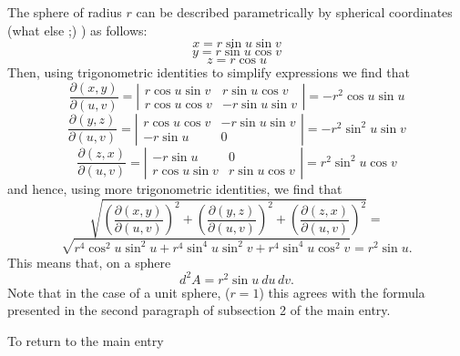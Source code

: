 \documentclass[12pt]{article}
\begin{document}
The sphere of radius $r$ can be described parametrically by spherical coordinates (what else ;) ) as follows:
 $$ x = r \sin u \sin v $$
 $$ y = r \sin u \cos v $$
 $$ z = r \cos u $$
Then, using trigonometric identities to simplify expressions we find that
 $$\frac{\partial (x, y)}{\partial (u,v)} =
\left| \begin{matrix}
r \cos u \sin v & r \sin u \cos v \\
r \cos u \cos v & -r \sin u \sin v
\end{matrix} \right| =
- r^2 \cos u \sin u$$
$$\frac{\partial (y, z)}{\partial (u,v)} =
\left| \begin{matrix}
r \cos u \cos v & -r \sin u \sin v \\
- r \sin u & 0
\end{matrix} \right| =
- r^2 \sin^2 u \sin v$$
$$\frac{\partial (z, x)}{\partial (u,v)} =
\left| \begin{matrix}
- r \sin u & 0 \\
r \cos u \sin v & r \sin u \cos v
\end{matrix} \right| =
r^2 \sin^2 u \cos v$$
and hence, using more trigonometric identities, we find that
 $$\sqrt{ \left(  \frac{\partial (x,y)}{\partial (u,v)} \right)^2 +  \left( \frac{\partial (y,z)}{\partial (u,v)} \right)^2 + \left( \frac{\partial (z,x)}{\partial (u,v)} \right)^2 } =$$
 $$\sqrt{ r^4 \cos^2 u \sin^2 u + r^4 \sin^4 u \sin^2 v + r^4 \sin^4 u \cos^2 v } = r^2 \sin u.$$
This means that, on a sphere
 $$d^2 A = r^2 \sin u \> du \, dv.$$
Note that in the case of a unit sphere, ($r = 1$) this agrees with the formula presented in the second paragraph of subsection 2 of the main entry.

To return to the main entry 
\end{document}
